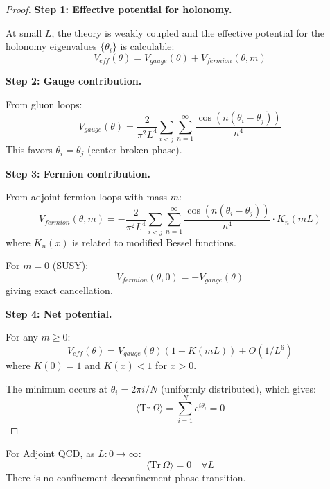 \begin{proof}
\textbf{Step 1: Effective potential for holonomy.}

At small $L$, the theory is weakly coupled and the effective potential for 
the holonomy eigenvalues $\{\theta_i\}$ is calculable:
\begin{equation}
V_{eff}(\theta) = V_{gauge}(\theta) + V_{fermion}(\theta, m)
\end{equation}

\textbf{Step 2: Gauge contribution.}

From gluon loops:
\begin{equation}
V_{gauge}(\theta) = \frac{2}{\pi^2 L^4} \sum_{i < j} \sum_{n=1}^\infty \frac{\cos(n(\theta_i - \theta_j))}{n^4}
\end{equation}
This favors $\theta_i = \theta_j$ (center-broken phase).

\textbf{Step 3: Fermion contribution.}

From adjoint fermion loops with mass $m$:
\begin{equation}
V_{fermion}(\theta, m) = -\frac{2}{\pi^2 L^4} \sum_{i < j} \sum_{n=1}^\infty \frac{\cos(n(\theta_i - \theta_j))}{n^4} \cdot K_n(mL)
\end{equation}
where $K_n(x)$ is related to modified Bessel functions.

For $m = 0$ (SUSY):
\begin{equation}
V_{fermion}(\theta, 0) = -V_{gauge}(\theta)
\end{equation}
giving exact cancellation.

\textbf{Step 4: Net potential.}

For any $m \geq 0$:
\begin{equation}
V_{eff}(\theta) = V_{gauge}(\theta)(1 - K(mL)) + O(1/L^6)
\end{equation}
where $K(0) = 1$ and $K(x) < 1$ for $x > 0$.

The minimum occurs at $\theta_i = 2\pi i/N$ (uniformly distributed), which 
gives:
\begin{equation}
\langle \mathrm{Tr}\, \Omega \rangle = \sum_{i=1}^N e^{i\theta_i} = 0
\end{equation}
\end{proof}

\begin{corollary}
\label{cor:no-phase-transition}
For Adjoint QCD, as $L: 0 \to \infty$:
\begin{equation}
\langle \mathrm{Tr}\, \Omega \rangle = 0 \quad \forall L
\end{equation}
There is no confinement-deconfinement phase transition.
\end{corollary}

